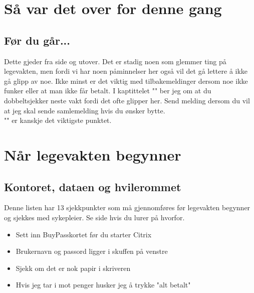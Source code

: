 \documentclass[12pt,a4paper]{memoir}
\begin{document}
\chapter{Så var det over for denne gang}\label{chap:desc_lv_slutt}	 
	\section{Før du går...}
	Dette gjeder fra side \pageref{sec:elv_regns} og utover. Det er stadig noen som glemmer ting på legevakten, men fordi vi har noen påminnelser her også vil det gå lettere å ikke gå glipp av noe. Ikke minst er det viktig med tilbakemeldinger dersom noe ikke funker eller at man ikke får betalt. I kaptittelet "" ber jeg om at du dobbeltsjekker neste vakt fordi det ofte glipper her. Send melding dersom du vil at jeg skal sende samlemelding hvis du ønsker bytte.\\

	"" er kanskje det viktigste punktet. 


\appendix
 	\renewcommand{\labelitemi}{$\Box$}%
 	\renewcommand{\labelitemii}{$\Box$}%

\newpage
\chapter{Når legevakten begynner}\label{chap:lv_start}
	\section{Kontoret, dataen og hvilerommet}\label{sec:start_kontor}
	Denne listen har 13 sjekkpunkter som må gjennomføres før legevakten begynner og sjekkes med sykepleier. Se side \pageref{chap:desc_lv_start} hvis du lurer på hvorfor. \\
		\begin{itemize}
					\item Sett inn BuyPasskortet før du starter Citrix
					\item Brukernavn og passord ligger i skuffen på venstre  
			\item Sjekk om det er nok papir i skriveren
			\item Hvis jeg tar i mot penger husker jeg å trykke "alt betalt"
		\end{itemize}
\end{document}
